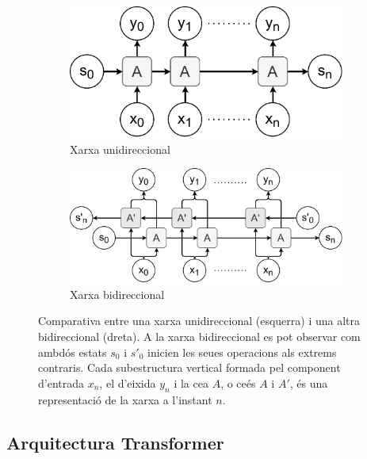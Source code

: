\begin{figure}[ht!]
    \centering
    \begin{subfigure}{0.3\textwidth}
        \centering
        \includegraphics[width=\textwidth]{figuras/lstm_vs_blstm_a.pdf}
        \caption{Xarxa unidireccional}
    \end{subfigure}
    \hfill
    \begin{subfigure}{0.6\textwidth}
        \centering
        \includegraphics[width=\textwidth]{figuras/lstm_vs_blstm_b.pdf}
        \caption{Xarxa bidireccional}
    \end{subfigure}
    \caption{Comparativa entre una xarxa unidireccional (esquerra) i una altra bidireccional (dreta). A la xarxa bidireccional es pot observar com ambdós estats $s_0$ i $s'_0$ inicien les seues operacions als extrems contraris. Cada subestructura vertical formada pel component d'entrada $x_n$, el d'eixida $y_n$ i la ce\lgem a $A$, o ce\lgem és $A$ i $A'$, és una representació de la xarxa a l'instant $n$.}
    \label{fig:lstm_vs_blstm}
\end{figure}



\subsection{Arquitectura Transformer}

